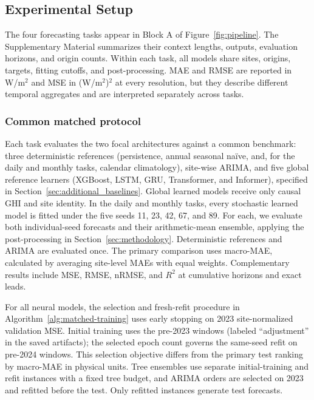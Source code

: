 \subsection{Experimental Setup}
\label{sec:experiments}

The four forecasting tasks appear in Block A of Figure~\ref{fig:pipeline}.
The Supplementary Material summarizes their context lengths, outputs,
evaluation horizons, and origin counts. Within each task, all models share
sites, origins, targets, fitting cutoffs, and post-processing. MAE and RMSE
are reported in W/m$^2$ and MSE in (W/m$^2$)$^2$ at every resolution, but
they describe different temporal aggregates and are interpreted separately
across tasks.

\subsubsection{Common matched protocol}

Each task evaluates the two focal architectures against a common benchmark:
three deterministic references (persistence, annual seasonal na\"ive, and,
for the daily and monthly tasks, calendar climatology), site-wise ARIMA, and
five global reference learners (XGBoost, LSTM, GRU, Transformer, and
Informer), specified in Section~\ref{sec:additional_baselines}. Global
learned models receive only causal GHI and site identity. In the daily and
monthly tasks, every stochastic learned model is fitted under the five seeds
11, 23, 42, 67, and 89. For each, we evaluate both individual-seed forecasts
and their arithmetic-mean ensemble, applying the post-processing in
Section~\ref{sec:methodology}. Deterministic references and ARIMA are
evaluated once. The primary comparison uses macro-MAE, calculated by
averaging site-level MAEs with equal weights. Complementary results include
MSE, RMSE, nRMSE, and $R^2$ at cumulative horizons and exact leads.

For all neural models, the selection and fresh-refit procedure in
Algorithm~\ref{alg:matched-training} uses early stopping on 2023
site-normalized validation MSE. Initial training uses the pre-2023 windows
(labeled ``adjustment'' in the saved artifacts); the selected epoch count governs
the same-seed refit on pre-2024 windows. This selection objective differs from
the primary test ranking by macro-MAE in physical units. Tree ensembles use
separate initial-training and refit instances with a fixed tree budget, and
ARIMA orders are selected on 2023 and refitted before the test. Only
refitted instances generate test forecasts.

